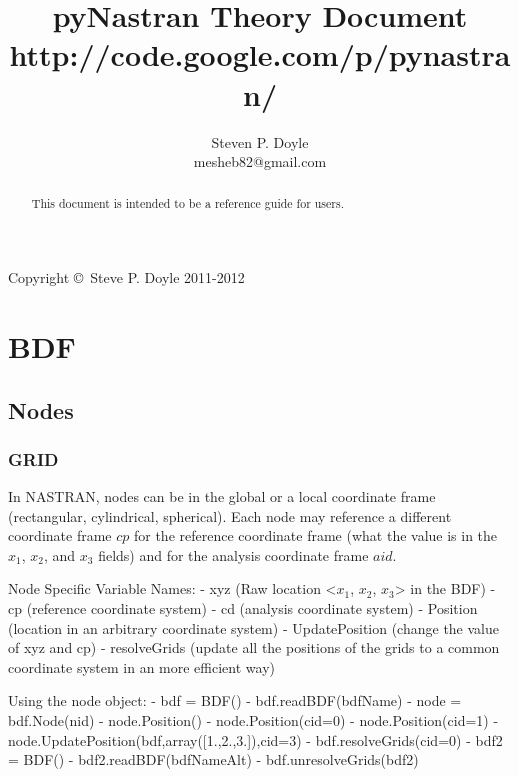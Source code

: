 
\title{pyNastran Theory Document \\
\small http://code.google.com/p/pynastran/ }
\author{Steven P. Doyle\\
{\small mesheb82@gmail.com}
}

\maketitle

\begin{abstract}
This document is intended to be a reference guide for users.
\end{abstract}

Copyright \copyright\ Steve P. Doyle 2011-2012
\newpage

\tableofcontents
\newpage

\section{BDF}

 \subsection{Nodes}
  \subsubsection{GRID}
     In NASTRAN, nodes can be in the global or a local coordinate
     frame (rectangular, cylindrical, spherical).  Each node may reference
     a different coordinate frame $cp$ for the reference coordinate frame
     (what the value is in the $x_1$, $x_2$, and $x_3$ fields) and for the
     analysis coordinate frame $aid$.
     
     Node Specific Variable Names:
      - xyz (Raw location <$x_1$, $x_2$, $x_3$> in the BDF)
      - cp (reference coordinate system)
      - cd (analysis  coordinate system)
      - Position (location in an arbitrary coordinate system)
      - UpdatePosition (change the value of xyz and cp)
      - resolveGrids (update all the positions of the grids to a common coordinate system in an more efficient way)

     Using the node object:
      - bdf = BDF()
      - bdf.readBDF(bdfName)
      - node = bdf.Node(nid)
      - node.Position()          %
      - node.Position(cid=0)    %
      - node.Position(cid=1)    %
      - node.UpdatePosition(bdf,array([1.,2.,3.]),cid=3) %
      - bdf.resolveGrids(cid=0) %
      - bdf2 = BDF()
      - bdf2.readBDF(bdfNameAlt)
      - bdf.unresolveGrids(bdf2) %
      
